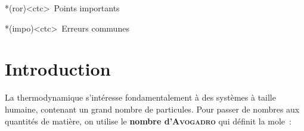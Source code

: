 \documentclass[../../main/main.tex]{subfiles}
\begin{document}
\begin{tcn}
	\begin{tcn}*(ror)<ctc>{\iconhart~Points importants}
	\end{tcn}
	\begin{tcn}*(impo)<ctc>{\iconimpo~Erreurs communes}
	\end{tcn}
\end{tcn}

\vspace*{\fill}
\newpage


\section{Introduction}
La thermodynamique s'intéresse fondamentalement à des systèmes à taille humaine,
contenant un grand nombre de particules. Pour passer de nombres aux quantités de
matière, on utilise le \textbf{nombre d'\textsc{Avogadro}} qui définit la mole~:
\end{document}
